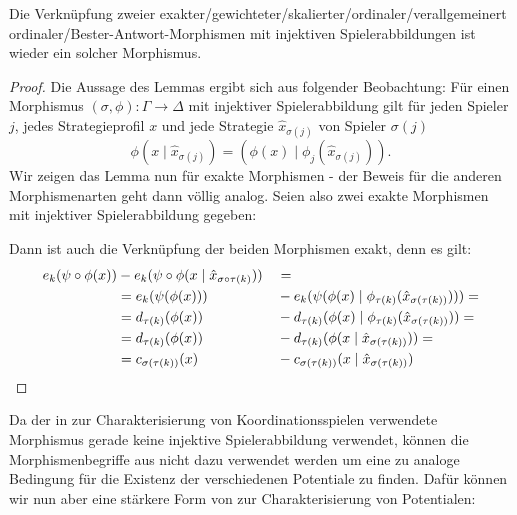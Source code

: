 \begin{lemma}\label{lemma:KompositionVonMorphismen}
	Die Verknüpfung zweier exakter/gewichteter/skalierter/ordinaler/verallgemeinert ordinaler/Bester-Antwort-Morphismen mit injektiven Spielerabbildungen ist wieder ein solcher Morphismus.
\end{lemma}

\begin{proof}
	Die Aussage des Lemmas ergibt sich aus folgender Beobachtung: Für einen Morphismus $(\sigma, \phi): \Gamma \to \Delta$ mit injektiver Spielerabbildung gilt für jeden Spieler $j$, jedes Strategieprofil $x$ und jede Strategie $\hat{x}_{\sigma(j)}$ von Spieler $\sigma(j)$  
		\[\phi(x \mid \hat{x}_{\sigma(j)}) = (\phi(x) \mid \phi_{j}(\hat{x}_{\sigma(j)})).\]
	Wir zeigen das Lemma nun für exakte Morphismen - der Beweis für die anderen Morphismenarten geht dann völlig analog. Seien also zwei exakte Morphismen mit injektiver Spielerabbildung gegeben:
		\begin{center}\end{center}
	Dann ist auch die Verknüpfung der beiden Morphismen exakt, denn es gilt:
		\begin{align*}
			e_k(\psi\circ\phi(x)) &- e_k(\psi\circ\phi(x \mid \hat{x}_{\sigma\circ\tau(k)})) &&= \\
				&= e_k(\psi(\phi(x))) &&- e_k(\psi(\phi(x) \mid \phi_{\tau(k)}(\hat{x}_{\sigma(\tau(k))}))) = \\
				&= d_{\tau(k)}(\phi(x)) &&- d_{\tau(k)}(\phi(x) \mid \phi_{\tau(k)}(\hat{x}_{\sigma(\tau(k))})) = \\
				&= d_{\tau(k)}(\phi(x)) &&- d_{\tau(k)}(\phi(x \mid \hat{x}_{\sigma(\tau(k))})) = \\
				&= c_{\sigma(\tau(k))}(x) &&- c_{\sigma(\tau(k))}(x \mid \hat{x}_{\sigma(\tau(k))})
				\qedhere
		\end{align*}
\end{proof}

Da der in  zur Charakterisierung von Koordinationsspielen verwendete Morphismus gerade keine injektive Spielerabbildung verwendet, können die Morphismenbegriffe aus  nicht dazu verwendet werden um eine zu  analoge Bedingung für die Existenz der verschiedenen Potentiale zu finden. Dafür können wir nun aber eine stärkere Form von  zur Charakterisierung von Potentialen:

